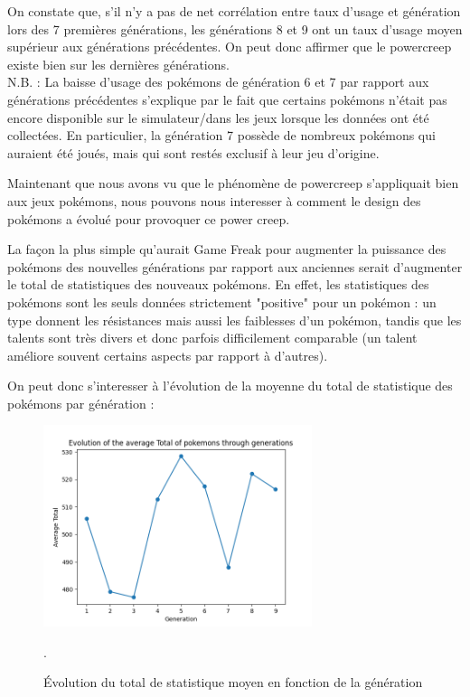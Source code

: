 \documentclass[a4paper,12pt]{article}
\begin{document}
On constate que, s'il n'y a pas de net corrélation entre taux d'usage et
génération lors des 7 premières générations, les générations 8 et 9 ont un taux
d'usage moyen supérieur aux générations précédentes. On peut donc affirmer que
le powercreep existe bien sur les dernières générations.\\
N.B. : La baisse d'usage des pokémons de génération 6 et 7 par rapport aux
générations précédentes s'explique par le fait que certains pokémons n'était pas
encore disponible sur le simulateur/dans les jeux lorsque les données ont été
collectées. En particulier, la génération 7 possède de nombreux pokémons qui
auraient été joués, mais qui sont restés exclusif à leur jeu d'origine.


Maintenant que nous avons vu que le phénomène de powercreep s'appliquait bien
aux jeux pokémons, nous pouvons nous interesser à comment le design des pokémons
a évolué pour provoquer ce power creep.

La façon la plus simple qu'aurait Game Freak pour augmenter la puissance des
pokémons des nouvelles générations par rapport aux anciennes serait d'augmenter
le total de statistiques des nouveaux pokémons. En effet, les statistiques des
pokémons sont les seuls données strictement "positive" pour un pokémon :  un
type donnent les résistances mais aussi les faiblesses d'un pokémon, tandis que
les talents sont très divers et donc parfois difficilement comparable (un talent
améliore souvent certains aspects par rapport à d'autres).

On peut donc s'interesser à l'évolution de la moyenne du total de statistique
des pokémons par génération :

\begin{figure}[htbp]
    \centering
    \includegraphics[width=0.7\textwidth]{Image/avg_total_per_generation.png}
    \caption{Évolution du total de statistique moyen en fonction de la
    génération}.
    \label{fig:image5}
\end{figure}
\end{document}
